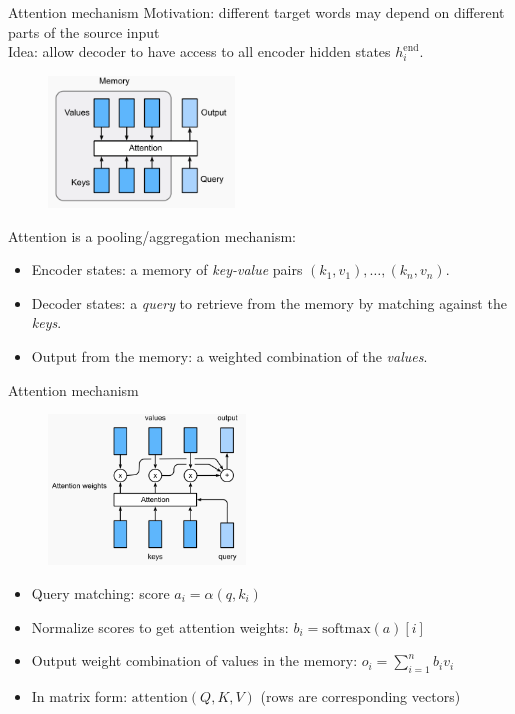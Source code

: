 \documentclass[usenames,dvipsnames,notes]{beamer}
\begin{document}
\begin{frame}
    {Attention mechanism}
    Motivation: different target words may depend on different parts of the source input\\
    Idea: allow decoder to have access to all encoder hidden states $h^{\text{end}}_i$.

    \vspace{-1em}
    \begin{figure}
        \includegraphics[height=3.5cm]{figures/attention}
    \end{figure}
    \vspace{-1em}
   
    Attention is a pooling/aggregation mechanism:\\
    \begin{itemize}
        \item Encoder states: a memory of \emph{key-value} pairs $(k_1, v_1), \ldots, (k_n, v_n)$.
        \item Decoder states: a \emph{query} to retrieve from the memory by matching against the \emph{keys}.
        \item Output from the memory: a weighted combination of the \emph{values}.
    \end{itemize}
\end{frame}

\begin{frame}
    {Attention mechanism}
    \vspace{-1em}
    \begin{figure}
        \includegraphics[height=4cm]{figures/attention-2}
    \end{figure}
    \vspace{-1em}

    \begin{itemize}
        \item Query matching: score $a_i = \alpha(q, k_i)$
        \item Normalize scores to get attention weights: $b_i = \text{softmax}(a)[i]$
        \item Output weight combination of values in the memory: $o_i = \sum_{i=1}^n b_i v_i$
        \item In matrix form: $\text{attention}(Q, K, V)$ (rows are corresponding vectors)
    \end{itemize}
\end{frame}
\end{document}
